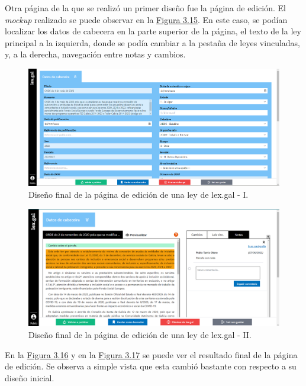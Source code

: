 Otra página de la que se realizó un primer diseño fue la página de edición. El {\it mockup} realizado se puede observar en la \hyperref[enlaceMockupEdicionDiseno]{Figura 3.15}. En este caso, se podían localizar los datos de cabecera en la parte superior de la página, el texto de la ley principal a la izquierda, donde se podía cambiar a la pestaña de leyes vinculadas, y, a la derecha, navegación entre notas y cambios.

\begin{figure}[H]
\centerline{\includegraphics[width=13cm]{figuras/manualUsuario/EditarCabecera.PNG}}
\caption{Diseño final de la página de edición de una ley de lex.gal - I.}
\label{enlaceCabeceraDiseno}
\end{figure}

\begin{figure}[H]
\centerline{\includegraphics[width=13cm]{figuras/manualUsuario/PestanaNotas.PNG}}
\caption{Diseño final de la página de edición de una ley de lex.gal - II.}
\label{enlaceEdicionLexGalDiseno}
\end{figure}

En la \hyperref[enlaceCabeceraDiseno]{Figura 3.16} y en la \hyperref[enlaceEdicionLexGalDiseno]{Figura 3.17} se puede ver el resultado final de la página de edición. Se observa a simple vista que esta cambió bastante con respecto a su diseño inicial.
\\

